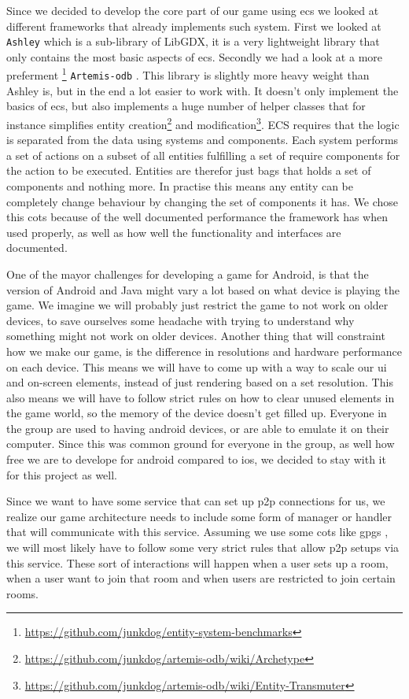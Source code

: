 Since we decided to develop the core part of our game using \gls{ecs} we looked at different frameworks that already implements such system. First we looked at \texttt{Ashley} \citep{ashley} which is a sub-library of LibGDX, it is a very lightweight library that only contains the most basic aspects of \gls{ecs}. Secondly we had a look at a more preferment \footnote{\url{https://github.com/junkdog/entity-system-benchmarks}} \texttt{Artemis-odb} \citep{artemis-odb}. This library is slightly more heavy weight than Ashley is, but in the end a lot easier to work with. It doesn't only implement the basics of ecs, but also implements a huge number of helper classes that for instance simplifies entity creation\footnote{\url{https://github.com/junkdog/artemis-odb/wiki/Archetype}} and modification\footnote{\url{https://github.com/junkdog/artemis-odb/wiki/Entity-Transmuter}}. ECS requires that the logic is separated from the data using systems and components. Each system performs a set of actions on a subset of all entities fulfilling a set of require components for the action to be executed. Entities are therefor just bags that holds a set of components and nothing more. In practise this means any entity can be completely change behaviour by changing the set of components it has.
We chose this \gls{cots} because of the well documented performance the framework has when used properly, as well as how well the functionality and interfaces are documented.

One of the mayor challenges for developing a game for Android, is that the version of Android and Java might vary a lot based on what device is playing the game. We imagine we will probably just restrict the game to not work on older devices, to save ourselves some headache with trying to understand why something might not work on older devices. Another thing that will constraint how we make our game, is the difference in resolutions and hardware performance on each device. This means we will have to come up with a way to scale our \gls{ui} and on-screen elements, instead of just rendering based on a set resolution. This also means we will have to follow strict rules on how to clear unused elements in the game world, so the memory of the device doesn't get filled up.
Everyone in the group are used to having android devices, or are able to emulate it on their computer. Since this was common ground for everyone in the group, as well how free we are to develope for android compared to ios, we decided to stay with it for this project as well.

Since we want to have some service that can set up \gls{p2p} connections for us, we realize our game architecture needs to include some form of manager or handler that will communicate with this service. Assuming we use some \gls{cots} like \gls{gpgs} \citep{gpgs}, we will most likely have to follow some very strict rules that allow \gls{p2p} setups via this service. These sort of interactions will happen when a user sets up a room, when a user want to join that room and when users are restricted to join certain rooms.

